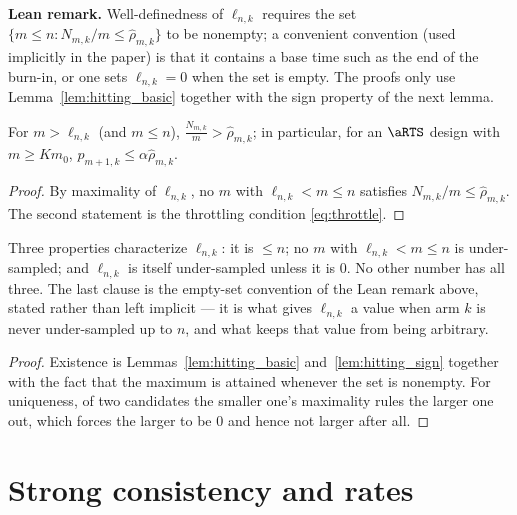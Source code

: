 \textbf{Lean remark.} Well-definedness of $\ell_{n,k}$ requires the set
$\{m\le n : N_{m,k}/m \le \hat\rho_{m,k}\}$ to be nonempty; a convenient
convention (used implicitly in the paper) is that it contains a base time such
as the end of the burn-in, or one sets $\ell_{n,k}=0$ when the set is empty.
The proofs only use Lemma~\ref{lem:hitting_basic} together with the sign
property of the next lemma.

\begin{lemma}\label{lem:hitting_sign}
\leanok
{}
For $m > \ell_{n,k}$ (and $m \le n$), $\frac{N_{m,k}}{m} > \hat{\rho}_{m,k}$;
in particular, for an $\aRTS$ design with $m \ge Km_0$, $p_{m+1,k} \le \alpha\hat{\rho}_{m,k}$.
\end{lemma}

\begin{proof}\leanok
By maximality of $\ell_{n,k}$, no $m$ with $\ell_{n,k} < m \le n$ satisfies
$N_{m,k}/m \le \hat{\rho}_{m,k}$. The second statement is the throttling
condition \eqref{eq:throttle}.
\end{proof}

\begin{lemma}\label{lem:hitting_unique}
\leanok
{}
Three properties characterize $\ell_{n,k}$: it is $\le n$; no $m$ with $\ell_{n,k}<m\le n$ is
under-sampled; and $\ell_{n,k}$ is itself under-sampled unless it is $0$. No other number has all
three. The last clause is the empty-set convention of the Lean remark above, stated rather than
left implicit — it is what gives $\ell_{n,k}$ a value when arm $k$ is never under-sampled up to
$n$, and what keeps that value from being arbitrary.
\end{lemma}

\begin{proof}\leanok
{}
Existence is Lemmas~\ref{lem:hitting_basic} and~\ref{lem:hitting_sign} together with the fact that
the maximum is attained whenever the set is nonempty. For uniqueness, of two candidates the smaller
one's maximality rules the larger one out, which forces the larger to be $0$ and hence not larger
after all.
\end{proof}


\chapter{Strong consistency and rates}
\label{chap:consistency}

